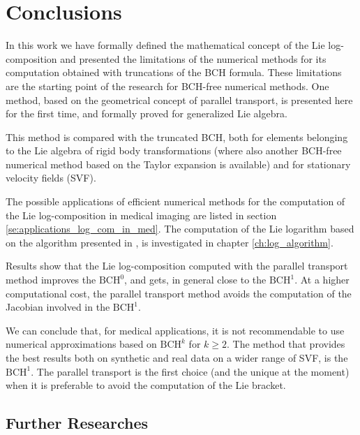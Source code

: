 
\chapter{Conclusions}\label{ch:conclusions}

In this work we have formally defined the mathematical concept of the Lie log-composition and presented the limitations of the numerical methods for its computation obtained with truncations of the BCH formula. These limitations are the starting point of the research for BCH-free numerical methods. 
One method, based on the geometrical concept of parallel transport, is presented here for the first time, and formally proved for generalized Lie algebra.

This method is compared with the truncated BCH, both for elements belonging to the Lie algebra of rigid body transformations (where also another BCH-free numerical method based on the Taylor expansion is available) and for stationary velocity fields (SVF).

The possible applications of efficient numerical methods for the computation of the Lie log-composition in medical imaging are listed in section \ref{se:applications_log_com_in_med}. The computation of the Lie logarithm based on the algorithm presented in \cite{bossa2008new}, is investigated in chapter \ref{ch:log_algorithm}.

Results show that the Lie log-composition computed with the parallel transport method improves the $\text{BCH}^0$, and gets, in general close to the $\text{BCH}^1$. At a higher computational cost, the parallel transport method avoids the computation of the Jacobian involved in the $\text{BCH}^1$.

We can conclude that, for medical applications, it is not recommendable to use numerical approximations based on $\text{BCH}^k$ for $k\geq 2$. The method that provides the best results both on synthetic and real data on a wider range of SVF, is the $\text{BCH}^1$. The parallel transport is the first choice (and the unique at the moment) when it is preferable to avoid the computation of the Lie bracket. 


\section{Further Researches}\label{se:further_research}

